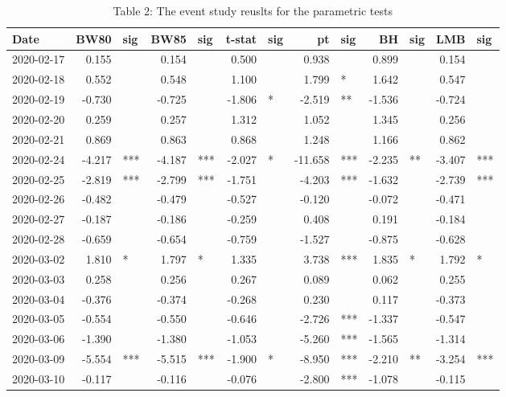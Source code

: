 \documentclass[
]{article}
\begin{document}
\begin{table}

\caption{\label{tab:sectoralEffect}Table 2: The event study reuslts for the parametric tests}
\centering
\begin{tabular}[t]{l|r|l|r|l|r|l|r|l|r|l|r|l}
\hline
Date & BW80 & sig & BW85 & sig & t-stat & sig & pt & sig & BH & sig & LMB & sig\\
\hline
2020-02-17 & 0.155 &  & 0.154 &  & 0.500 &  & 0.938 &  & 0.899 &  & 0.154 & \\
\hline
2020-02-18 & 0.552 &  & 0.548 &  & 1.100 &  & 1.799 & * & 1.642 &  & 0.547 & \\
\hline
2020-02-19 & -0.730 &  & -0.725 &  & -1.806 & * & -2.519 & ** & -1.536 &  & -0.724 & \\
\hline
2020-02-20 & 0.259 &  & 0.257 &  & 1.312 &  & 1.052 &  & 1.345 &  & 0.256 & \\
\hline
2020-02-21 & 0.869 &  & 0.863 &  & 0.868 &  & 1.248 &  & 1.166 &  & 0.862 & \\
\hline
2020-02-24 & -4.217 & *** & -4.187 & *** & -2.027 & * & -11.658 & *** & -2.235 & ** & -3.407 & ***\\
\hline
2020-02-25 & -2.819 & *** & -2.799 & *** & -1.751 &  & -4.203 & *** & -1.632 &  & -2.739 & ***\\
\hline
2020-02-26 & -0.482 &  & -0.479 &  & -0.527 &  & -0.120 &  & -0.072 &  & -0.471 & \\
\hline
2020-02-27 & -0.187 &  & -0.186 &  & -0.259 &  & 0.408 &  & 0.191 &  & -0.184 & \\
\hline
2020-02-28 & -0.659 &  & -0.654 &  & -0.759 &  & -1.527 &  & -0.875 &  & -0.628 & \\
\hline
2020-03-02 & 1.810 & * & 1.797 & * & 1.335 &  & 3.738 & *** & 1.835 & * & 1.792 & *\\
\hline
2020-03-03 & 0.258 &  & 0.256 &  & 0.267 &  & 0.089 &  & 0.062 &  & 0.255 & \\
\hline
2020-03-04 & -0.376 &  & -0.374 &  & -0.268 &  & 0.230 &  & 0.117 &  & -0.373 & \\
\hline
2020-03-05 & -0.554 &  & -0.550 &  & -0.646 &  & -2.726 & *** & -1.337 &  & -0.547 & \\
\hline
2020-03-06 & -1.390 &  & -1.380 &  & -1.053 &  & -5.260 & *** & -1.565 &  & -1.314 & \\
\hline
2020-03-09 & -5.554 & *** & -5.515 & *** & -1.900 & * & -8.950 & *** & -2.210 & ** & -3.254 & ***\\
\hline
2020-03-10 & -0.117 &  & -0.116 &  & -0.076 &  & -2.800 & *** & -1.078 &  & -0.115 & \\

\end{tabular}
\end{table}
\end{document}
